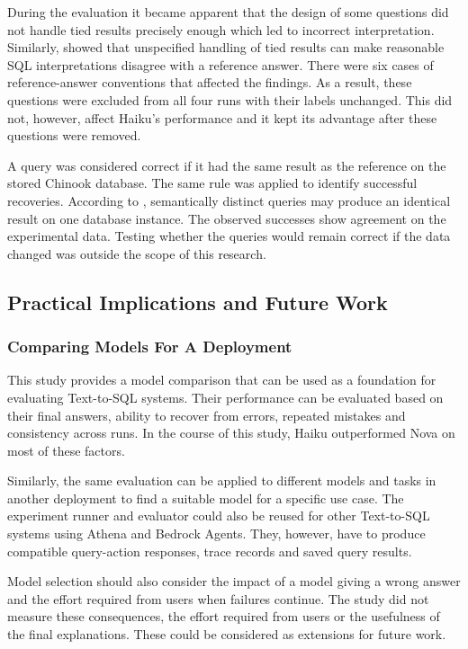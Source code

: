 During the evaluation it became apparent that the design of some questions
did not handle tied results precisely enough which led to incorrect interpretation.
Similarly, \citet{pourreza2023evaluating} showed that unspecified handling 
of tied results can make reasonable SQL interpretations disagree with a reference answer. 
There were six cases of reference-answer conventions that affected the findings. 
As a result, these questions were excluded from all four runs with their labels unchanged.
This did not, however, affect Haiku's performance and it 
kept its advantage after these questions were removed.

A query was considered correct if it had the same result as the reference
on the stored Chinook database.
The same rule was applied to identify successful recoveries.
According to \citet{zhong2020semantic},
semantically distinct queries may produce an identical result
on one database instance.
The observed successes show agreement on the experimental data.
Testing whether the queries would remain correct if the data changed
was outside the scope of this research.

\subsection{Practical Implications and Future Work}
\label{sec:discussion-implications}

\subsubsection{Comparing Models For A Deployment}

This study provides a model comparison that can be used as a foundation for evaluating Text-to-SQL systems.
Their performance can be evaluated based on their final answers, 
ability to recover from errors, repeated mistakes and consistency across runs. 
In the course of this study, Haiku outperformed Nova on most of these factors.

Similarly, the same evaluation can be applied to different models
and tasks in another deployment to find a suitable model for a specific use case. 
The experiment runner and evaluator could also be reused for other
Text-to-SQL systems using Athena and Bedrock Agents.
They, however, have to produce compatible query-action responses, 
trace records and saved query results.

Model selection should also consider the impact of a model giving a wrong answer 
and the effort required from users when failures continue.
The study did not measure these consequences, 
the effort required from users or the usefulness of the final explanations.
These could be considered as extensions for future work.

